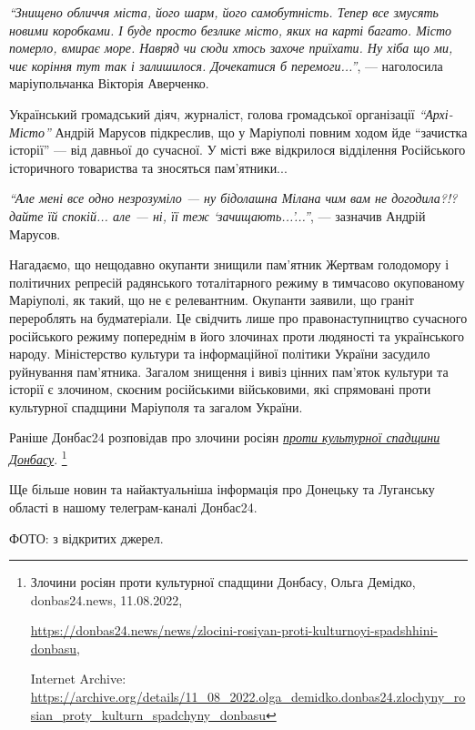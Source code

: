 \begin{leftbar}
\emph{\enquote{Знищено обличчя міста, його шарм, його самобутність. Тепер все змусять
новими коробками. І буде просто безлике місто, яких на карті багато. Місто
померло, вмирає море. Навряд чи сюди хтось захоче приїхати. Ну хіба що ми, чиє
коріння тут так і залишилося. Дочекатися б перемоги...}}, — наголосила
маріупольчанка Вікторія Аверченко. 
\end{leftbar}

Український громадський діяч, журналіст, голова громадської організації
\emph{\enquote{Архі-Місто}} Андрій Марусов підкреслив, що у Маріуполі повним ходом йде
\enquote{зачистка історії} — від давньої до сучасної. У місті вже відкрилося відділення
Російського історичного товариства та зносяться пам'ятники...

\begin{leftbar}
\emph{\enquote{Але мені все одно незрозуміло — ну бідолашна Мілана чим вам не догодила?!?
дайте їй спокій... але — ні, її теж \enquote{зачищають...}...}}, — зазначив Андрій Марусов.  
\end{leftbar}


Нагадаємо, що нещодавно окупанти знищили пам'ятник Жертвам голодомору і
політичних репресій радянського тоталітарного режиму в тимчасово окупованому
Маріуполі, як такий, що не є релевантним. Окупанти заявили, що граніт
перероблять на будматеріали. Це свідчить лише про правонаступництво сучасного
російського режиму попереднім в його злочинах проти людяності та українського
народу. Міністерство культури та інформаційної політики України засудило
руйнування пам'ятника. Загалом знищення і вивіз цінних пам'яток культури та
історії є злочином, скоєним російськими військовими, які спрямовані проти
культурної спадщини Маріуполя та загалом України.

Раніше Донбас24 розповідав про злочини росіян \href{https://archive.org/details/11_08_2022.olga_demidko.donbas24.zlochyny_rosian_proty_kulturn_spadchyny_donbasu}{\emph{проти культурної спадщини Донбасу}}.%
\footnote{Злочини росіян проти культурної спадщини Донбасу, Ольга Демідко, donbas24.news, 11.08.2022, \par%
\url{https://donbas24.news/news/zlocini-rosiyan-proti-kulturnoyi-spadshhini-donbasu}, \par%
Internet Archive: \url{https://archive.org/details/11_08_2022.olga_demidko.donbas24.zlochyny_rosian_proty_kulturn_spadchyny_donbasu}%
}

Ще більше новин та найактуальніша інформація про Донецьку та Луганську області
в нашому телеграм-каналі Донбас24.

ФОТО: з відкритих джерел.

